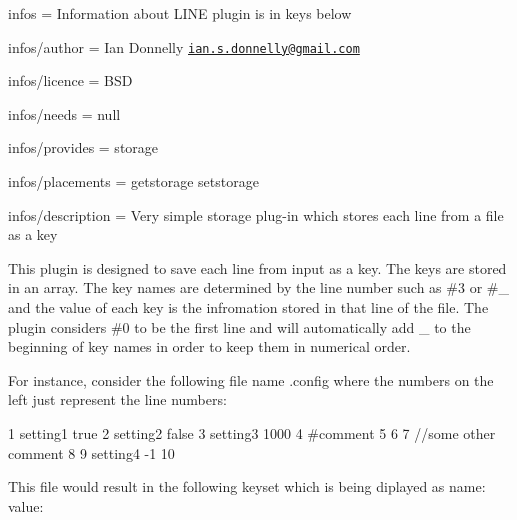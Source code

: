 
\begin{DoxyItemize}
\item infos = Information about L\+I\+N\+E plugin is in keys below
\item infos/author = Ian Donnelly \href{mailto:ian.s.donnelly@gmail.com}{\tt ian.\+s.\+donnelly@gmail.\+com}
\item infos/licence = B\+S\+D
\item infos/needs = null
\item infos/provides = storage
\item infos/placements = getstorage setstorage
\item infos/description = Very simple storage plug-\/in which stores each line from a file as a key
\end{DoxyItemize}

This plugin is designed to save each line from input as a key. The keys are stored in an array. The key names are determined by the line number such as {\ttfamily \#3} or {\ttfamily \#\+\_} and the value of each key is the infromation stored in that line of the file. The plugin considers {\ttfamily \#0} to be the first line and will automatically add {\ttfamily \+\_\+} to the beginning of key names in order to keep them in numerical order.

For instance, consider the following file name {\ttfamily .config} where the numbers on the left just represent the line numbers\+: \begin{DoxyVerb}1  setting1 true
2  setting2 false
3  setting3 1000
4  #comment
5
6
7  //some other comment
8
9  setting4 -1
10 
\end{DoxyVerb}


This file would result in the following keyset which is being diplayed as {\ttfamily name\+: value}\+: 
 
